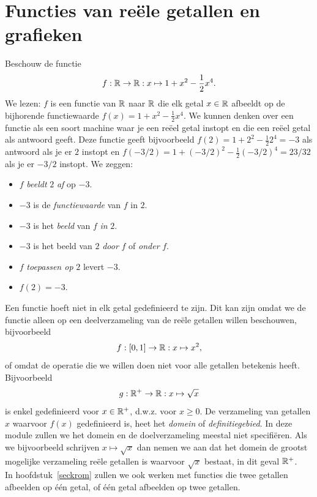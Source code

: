\section{Functies van re\"ele getallen en grafieken}

Beschouw de functie
\[
f:\mathbb{R} \rightarrow \mathbb{R}:x\mapsto 1+x^2-\frac{1}{2}x^4.
\]
We lezen: $f$ is een functie van $\mathbb{R}$ naar $\mathbb{R}$ die elk getal $x\in\mathbb{R}$
afbeeldt op de bijhorende functiewaarde $f(x)=1+x^2-\frac{1}{2}x^4$.  We kunnen
denken over een functie als een soort machine waar je een re\"eel
getal instopt en die een re\"eel getal als antwoord geeft. Deze
functie geeft bijvoorbeeld $f(2)=1+2^2-\frac{1}{2}2^4=-3$ als antwoord als je er
$2$ instopt en $f(-3/2)=1+(-3/2)^2-\frac{1}{2}(-3/2)^4=23/32$ als je er $-3/2$
instopt. We zeggen:
\begin{itemize}
\item $f$ {\em beeldt} $2$ {\em af} op $-3$.
\item $-3$ is de {\em functiewaarde} van $f$ in $2$.
\item $-3$ is het {\em beeld} van $f$ {\em in} $2$.
\item $-3$ is het beeld van $2$ {\em door} $f$ of {\em onder} $f$.
\item $f$ {\em toepassen op} $2$ levert $-3$.
\item $f(2)=-3$.
\end{itemize}

Een functie hoeft niet in elk getal gedefinieerd te zijn. Dit kan zijn
omdat we de functie alleen op een deelverzameling van de re\"ele
getallen willen beschouwen, bijvoorbeeld
\[
f:[0,1]\rightarrow \mathbb{R}:x\mapsto x^2,
\]
of omdat de operatie die we willen doen niet voor alle getallen
betekenis heeft. Bijvoorbeeld
\[
g:\mathbb{R}^+\rightarrow\mathbb{R}:x\mapsto\sqrt{x}
\]
is enkel gedefinieerd voor $x\in\mathbb{R}^+$, d.w.z. voor $x\geq 0$.  De
verzameling van getallen $x$ waarvoor $f(x)$ gedefinieerd is, heet het
{\em domein} of {\em definitiegebied}. In deze module zullen we het
domein en de doelverzameling meestal niet specifi\"eren. Als we
bijvoorbeeld schrijven $x\mapsto\sqrt{x}$ dan nemen we aan dat het
domein de grootst mogelijke verzameling re\"ele getallen is waarvoor
$\sqrt{x}$ bestaat, in dit geval $\mathbb{R}^+$.\\
In hoofdstuk~\ref{seckrom} zullen we ook werken met functies die twee
getallen afbeelden op \'e\'en getal, of \'e\'en getal afbeelden op
twee getallen. 

